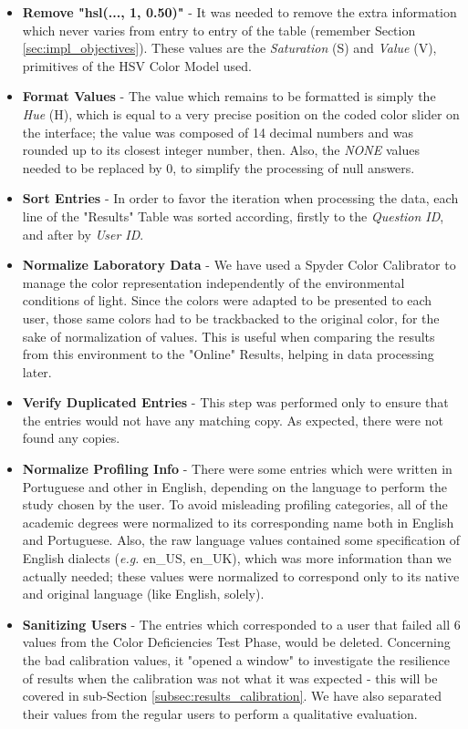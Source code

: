 \begin{itemize}
  \item \textbf{Remove "hsl(..., 1, 0.50)"} - It was needed to remove the extra information which never varies from entry to entry of the table
  (remember Section \ref{sec:impl_objectives}). These values are the \emph{Saturation} (S) and \emph{Value} (V), primitives of the HSV Color Model used.
  \item \textbf{Format Values} - The value which remains to be formatted is simply the \emph{Hue} (H),
  which is equal to a very precise position on the coded color slider on the interface; the value was composed of 14 decimal numbers and
  was rounded up to its closest integer number, then. Also, the \emph{NONE} values needed to be replaced by 0, to simplify the processing of null answers.
  \item \textbf{Sort Entries} - In order to favor the iteration when processing the data, each line of the "Results" Table was
  sorted according, firstly to the \emph{Question ID}, and after by \emph{User ID}.
  \item \textbf{Normalize Laboratory Data} - We have used a Spyder Color Calibrator to manage the color representation independently of the environmental
  conditions of light. Since the colors were adapted to be presented to each user, those same colors had to be trackbacked to the original color, for the
  sake of normalization of values. This is useful when comparing the results from this environment to the "Online" Results, helping in data processing later.
  \item \textbf{Verify Duplicated Entries} - This step was performed only to ensure that the entries would not have any matching copy. As expected,
  there were not found any copies.
  \item \textbf{Normalize Profiling Info} - There were some entries which were written in Portuguese and other in English, depending on
  the language to perform the study chosen by the user. To avoid misleading profiling categories, all of the academic degrees were normalized to its corresponding
  name both in English and Portuguese. Also, the raw language values contained some specification of English dialects (\emph{e.g.} en\_US, en\_UK),
  which was more information than we actually needed; these values were normalized to correspond only to its native and original language (like English, solely).
  \item \textbf{Sanitizing Users} - The entries which corresponded to a user that failed all 6 values from the Color Deficiencies Test Phase, would be
  deleted. Concerning the bad calibration values, it "opened a window" to investigate the resilience of results when the
  calibration was not what it was expected - this will be covered in sub-Section \ref{subsec:results_calibration}. We have also separated their values from
  the regular users to perform a qualitative evaluation.
\end{itemize} \par
